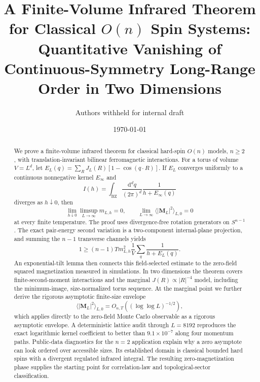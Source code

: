 \documentclass[aps,prb,twocolumn,groupedaddress,amsmath,amssymb,
               superscriptaddress,nofootinbib,floatfix]{revtex4-2}
\theoremstyle{plain}
\theoremstyle{definition}
\newcommand{\BZ}{\mathrm{BZ}}
\newcommand{\dd}{\mathrm{d}}
\begin{document}
\title{A Finite-Volume Infrared Theorem for Classical
       \texorpdfstring{$O(n)$}{O(n)} Spin
       Systems: Quantitative Vanishing of Continuous-Symmetry
       Long-Range Order in Two Dimensions}

\author{Authors withheld for internal draft}
\date{\today}

\begin{abstract}
We prove a finite-volume infrared theorem for classical hard-spin
$O(n)$ models, $n\ge2$, with translation-invariant bilinear ferromagnetic
interactions.  For a torus of volume $V=L^d$, let
$E_L(q)=\sum_RJ_L(R)[1-\cos(q\cdot R)]$.  If $E_L$ converges uniformly to
a continuous nonnegative kernel $E_\infty$ and
\[
 I(h)=\int_{\BZ}\frac{\dd^dq}{(2\pi)^d}
 \frac{1}{h+E_\infty(q)}
\]
diverges as $h\downarrow0$, then
\[
 \lim_{h\downarrow0}\limsup_{L\to\infty}m_{L,h}=0,
 \qquad
 \lim_{L\to\infty}\langle|\bm M_L|^2\rangle_{L,0}=0
\]
at every finite temperature.  The proof uses divergence-free rotation
generators on $S^{n-1}$.  The exact pair-energy second variation is a
two-component internal-plane projection, and summing the $n-1$ transverse
channels yields
\[
 1\ge(n-1)T m_{L,h}^2
 \frac1V\sum_q\frac1{h+E_L(q)}.
\]
An exponential-tilt lemma then connects this field-selected estimate to the
zero-field squared magnetization measured in simulations.  In two
dimensions the theorem covers finite-second-moment interactions and the
marginal $J(R)\propto |R|^{-4}$ model, including the minimum-image,
size-normalized torus sequence.  At the marginal point we further derive the
rigorous asymptotic finite-size envelope
\[
 \langle|\bm M_L|^2\rangle_{L,0}
 =O_{n,T}\!\left((\log\log L)^{-1/2}\right),
\]
which applies directly to the zero-field Monte Carlo observable as a rigorous
asymptotic envelope.  A deterministic lattice audit through
$L=8192$ reproduces the exact logarithmic kernel coefficient to better than
$9.1\times10^{-7}$ along four momentum paths.  Public-data diagnostics for
the $n=2$ application explain why a zero asymptote can look ordered over
accessible sizes.  Its established domain is classical bounded hard spins
with a divergent regulated infrared integral.  The resulting
zero-magnetization phase supplies the starting point for correlation-law and
topological-sector classification.
\end{abstract}

\maketitle
\end{document}
